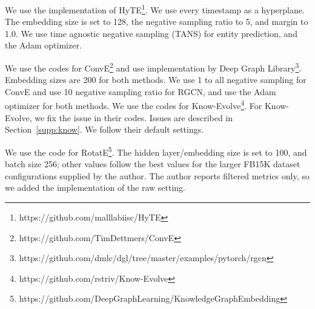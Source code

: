 
We use the implementation of HyTE\footnote{\scriptsize https://github.com/malllabiisc/HyTE}.
We use every timestamp as a hyperplane. 
The embedding size is set to 128, the negative sampling ratio to 5, and margin to 1.0. 
We use time agnostic negative sampling (TANS) for entity prediction, and the Adam optimizer.

We use the codes for ConvE\footnote{\scriptsize https://github.com/TimDettmers/ConvE} and use implementation by Deep Graph Library\footnote{\scriptsize https://github.com/dmlc/dgl/tree/master/examples/pytorch/rgcn}. 
Embedding sizes are 200 for both methods.
We use 1 to all negative sampling for ConvE and use 10 negative sampling ratio for RGCN, and use the Adam optimizer for both methods.
We use the codes for Know-Evolve\footnote{\scriptsize https://github.com/rstriv/Know-Evolve}.
For Know-Evolve, we fix the issue in their codes. Issues are described in Section~\ref{supp:know}.
We follow their default settings.

We use the code for RotatE\footnote{\scriptsize https://github.com/DeepGraphLearning/KnowledgeGraphEmbedding}. The hidden layer/embedding size is set to 100, and batch size 256; other values follow the best values for the larger FB15K dataset configurations supplied by the author. The author reports filtered metrics only, so we added the implementation of the raw setting. 



